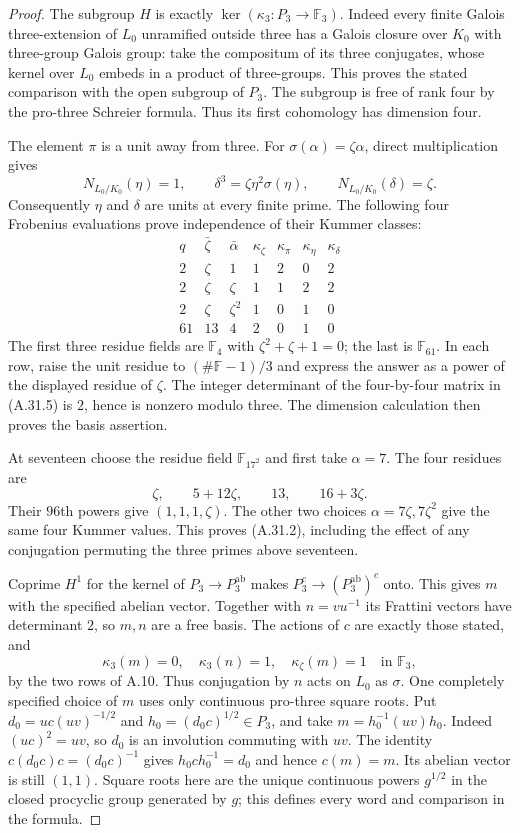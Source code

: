 \begin{proof}
The subgroup $H$ is exactly
$\ker(\kappa_3:P_3\to\mathbb F_3)$.
Indeed every finite Galois three-extension
of $L_0$ unramified outside three has
a Galois closure over $K_0$ with
three-group Galois group: take the
compositum of its three conjugates,
whose kernel over $L_0$ embeds in
a product of three-groups. This
proves the stated comparison with
the open subgroup of $P_3$.
The subgroup is free of rank four
by the pro-three Schreier formula.
Thus its first cohomology has
dimension four.

The element $\pi$ is a unit away
from three. For $\sigma(\alpha)=\zeta\alpha$,
direct multiplication gives
\[
 N_{L_0/K_0}(\eta)=1,
 \qquad
 \delta^3=\zeta\eta^2\sigma(\eta),
 \qquad
 N_{L_0/K_0}(\delta)=\zeta.
 \tag{A.31.4}
\]
Consequently $\eta$ and $\delta$
are units at every finite prime.
The following four Frobenius
evaluations prove independence
of their Kummer classes:
\[
\begin{array}{c|c|c|rrrr}
 q&\bar\zeta&\bar\alpha&
 \kappa_\zeta&\kappa_\pi&\kappa_\eta&\kappa_\delta\\\hline
 2&\zeta&1&1&2&0&2\\
 2&\zeta&\zeta&1&1&2&2\\
 2&\zeta&\zeta^2&1&0&1&0\\
 61&13&4&2&0&1&0
\end{array}
 \tag{A.31.5}
\]
The first three residue fields are
$\mathbb F_4$ with
$\zeta^2+\zeta+1=0$; the last
is $\mathbb F_{61}$. In each row,
raise the unit residue to
$(\#\mathbb F-1)/3$ and express
the answer as a power of the
displayed residue of $\zeta$.
The integer determinant of the
four-by-four matrix in (A.31.5)
is $2$, hence is nonzero modulo
three. The dimension calculation
then proves the basis assertion.

At seventeen choose the residue
field $\mathbb F_{17^2}$ and first
take $\alpha=7$. The four residues
are
\[
 \zeta,\qquad5+12\zeta,\qquad
 13,\qquad16+3\zeta.
\]
Their $96$th powers give
$(1,1,1,\zeta)$. The other two
choices $\alpha=7\zeta,7\zeta^2$
give the same four Kummer values.
This proves (A.31.2), including
the effect of any conjugation
permuting the three primes above
seventeen.

Coprime $H^1$ for the kernel
of $P_3\to P_3^{\mathrm{ab}}$
makes $P_3^c\to(P_3^{\mathrm{ab}})^c$
onto. This gives $m$ with the
specified abelian vector. Together
with $n=vu^{-1}$ its Frattini
vectors have determinant $2$,
so $m,n$ are a free basis.
The actions of $c$ are exactly
those stated, and
\[
 \kappa_3(m)=0,\quad
 \kappa_3(n)=1,\quad
 \kappa_\zeta(m)=1
       \quad\text{in }\mathbb F_3,
 \tag{A.31.6}
\]
by the two rows of A.10.
Thus conjugation by $n$ acts
on $L_0$ as $\sigma$.
One completely specified choice
of $m$ uses only continuous
pro-three square roots. Put
$d_0=uc(uv)^{-1/2}$ and
$h_0=(d_0c)^{1/2}\in P_3$, and
take $m=h_0^{-1}(uv)h_0$.
Indeed $(uc)^2=uv$, so $d_0$
is an involution commuting
with $uv$. The identity
$c(d_0c)c=(d_0c)^{-1}$ gives
$h_0ch_0^{-1}=d_0$ and hence
$c(m)=m$. Its abelian vector
is still $(1,1)$. Square roots
here are the unique continuous
powers $g^{1/2}$ in the closed
procyclic group generated by
$g$; this defines every word
and comparison in the formula.


\end{proof}
